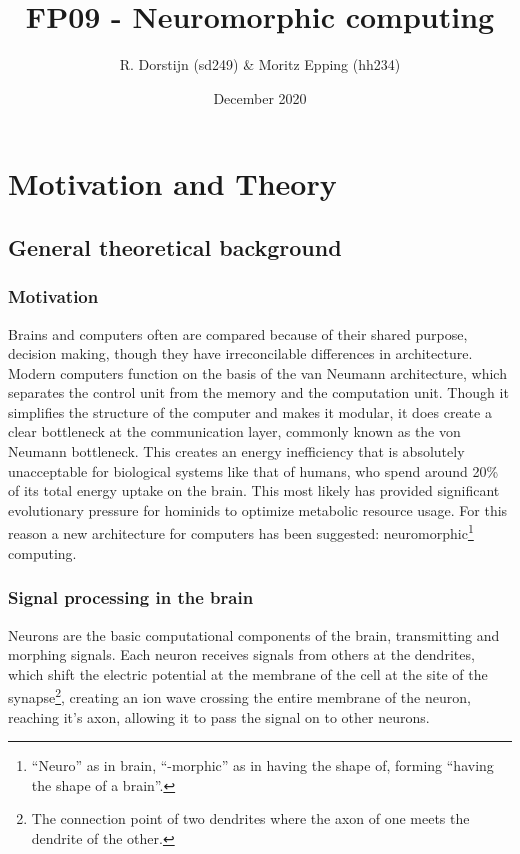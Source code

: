 \documentclass[a4paper,twocolumn]{article}
\title{FP09 - Neuromorphic computing}
\author{R. Dorstijn (sd249) \& Moritz Epping (hh234)}
\date{December 2020}
\begin{document}
\maketitle

\section{Motivation and Theory}
\subsection{General theoretical background}
\subsubsection{Motivation}
Brains and computers often are compared because of their shared purpose,
decision making, though they have irreconcilable differences in architecture.
Modern computers function on the basis of the van Neumann
architecture\cite{von-Neumann}, which separates the control unit from the memory
and the computation unit. Though it simplifies the structure of the computer and
makes it modular, it does create a clear bottleneck at the communication layer,
commonly known as the von Neumann bottleneck. This creates an energy
inefficiency that is absolutely unacceptable for biological systems like that of
humans, who spend around 20\% of its total energy uptake on the brain\cite{metabolic-rates}.
This most likely has provided significant evolutionary pressure for hominids to
optimize metabolic resource usage\cite{seymour2016fossil}. For this reason a new
architecture for computers has been suggested: neuromorphic\footnote{``Neuro''
as in brain, ``-morphic'' as in having the shape of, forming ``having the shape
of a brain''.} computing.

\subsubsection{Signal processing in the brain}
Neurons are the basic computational components of the
brain, transmitting and morphing signals. Each neuron receives signals from
others at the dendrites, which shift the electric potential at the membrane of
the cell at the site of the synapse\footnote{The connection point of two
dendrites where the axon of one meets the dendrite of the other.}, creating an
ion wave crossing the entire membrane of the neuron, reaching it's axon,
allowing it to pass the signal on to other neurons.
\end{document}
